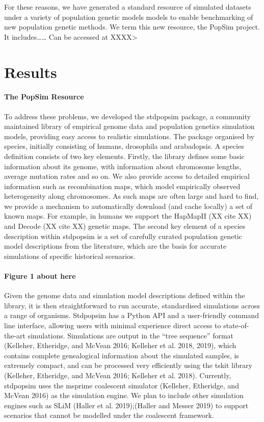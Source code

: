 \documentclass[12pt,halfline,a4paper]{ouparticle}
\begin{document}
For these reasons, we have generated a standard resource of simulated datasets
under a variety of population genetic models models to enable benchmarking of
new population genetic methods. We term this new resource, the PopSim project.
It includes…… Can be accessed at XXXX>

\section*{Results}
\paragraph{The PopSim Resource}
To address these problems, we developed the stdpopsim package, a community
maintained library of empirical genome data and population genetics simulation
models, providing easy access to realistic simulations.  The package organised
by species, initially consisting of humans, drosophila and arabadopsis. A
species definition consists of two key elements.  Firstly, the library defines
some basic information about its genome, with information about chromosome
lengths, average mutation rates and so on. We also provide access to detailed
empirical information such as recombination maps, which model empirically
observed heterogeneity along chromosomes. As such maps are often large and hard
to find, we provide a mechanism to automatically download (and cache locally) a
set of known maps. For example, in humans we support the HapMapII (XX cite XX) and
Decode (XX cite XX) genetic maps. The second key element of a species description
within stdpopsim is a set of carefully curated population genetic model
descriptions from the literature, which are the basis for accurate simulations
of specific historical scenarios.

\paragraph{Figure 1 about here}

Given the genome data and simulation model descriptions defined within the
library, it is then straightforward to run accurate, standardised simulations
across a range of organisms. Stdpopsim has a Python API and a user-friendly
command line interface, allowing users with minimal experience direct access to
state-of-the-art simulations. Simulations are output in the “tree sequence”
format (Kelleher, Etheridge, and McVean 2016; Kelleher et al. 2018, 2019), which
contains complete genealogical information about the simulated samples, is
extremely compact, and can be processed very efficiently using the tskit library
(Kelleher, Etheridge, and McVean 2016; Kelleher et al. 2018). Currently,
stdpopsim uses the  msprime coalescent simulator (Kelleher, Etheridge, and
McVean 2016) as the simulation engine. We plan to include other simulation
engines such as SLiM (Haller et al. 2019);(Haller and Messer 2019) to support
scenarios that cannot be modelled under the coalescent framework.
\end{document}
